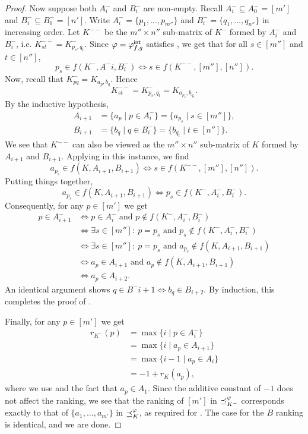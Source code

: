 \begin{proof}
    Now suppose both $A^-_i$ and $B^-_i$ are non-empty. Recall $A^-_i \subseteq
    A^-_0 = [m']$ and $B^-_i \subseteq B^-_0 = [n']$. Write $A^-_i = \{p_1,
    \ldots, p_{m''}\}$ and $B^-_i = \{q_1, \ldots, q_{n''}\}$ in increasing
    order. Let $K^{--}$ be the $m'' \times n''$ sub-matrix of $K^-$ formed by
    $A^-_i$ and $B^-_i$, i.e. $K^{--}_{st} = K^-_{p_s, q_t}$. Since $\varphi =
    {\varphi_{f, g}^\mathsf{int}}$ satisfies \smi{}, we get that for all $s \in [m'']$
    and $t \in [n'']$,
    \[
        p_s \in f(K^-, A^-i, B^-_i) \iff s \in f(K^{--}, [m''], [n'']).
    \]
    Now, recall that $K^-_{pq} = K_{a_p, b_q}$. Hence
    \[
        K^{--}_{st} = K^-_{p_s, q_t} = K_{a_{p_s}, b_{q_t}}.
    \]
    By the inductive hypothesis,
    \begin{align*}
        A_{i + 1} &= \{a_p \mid p \in A^-_i\} = \{a_{p_s} \mid s \in [m'']\}, \\
        B_{i + 1} &= \{b_q \mid q \in B^-_i\} = \{b_{q_t} \mid t \in [n'']\}.
    \end{align*}
    We see that $K^{--}$ can also be viewed as the $m'' \times n''$ sub-matrix
    of $K$ formed by $A_{i + 1}$ and $B_{i + 1}$. Applying \smi{} in
    this instance, we find
    \[
        a_{p_s} \in f(K, A_{i + 1}, B_{i + 1})
            \iff s \in f(K^{--}, [m''], [n'']).
    \]
    Putting things together,
    \[
        a_{p_s} \in f(K, A_{i + 1}, B_{i + 1})
            \iff p_s \in f(K^-, A^-_i, B^-_i).
    \]
    Consequently, for any $p \in [m']$ we get
    \begin{align*}
        p \in A^-_{i + 1}
        &\iff p \in A^-_i \text{ and } p \notin f(K^-, A^-_i, B^-_i) \\
        &\iff \exists s \in [m'']:\ p = p_s \text{ and } p_s \notin f(K^-, A^-_i, B^-_i) \\
        &\iff \exists s \in [m'']:\ p = p_s \text{ and } a_{p_s} \notin f(K, A_{i + 1}, B_{i + 1}) \\
        &\iff a_p \in A_{i + 1} \text{ and } a_p \notin f(K, A_{i + 1}, B_{i + 1}) \\
        &\iff a_p \in A_{i + 2}.
    \end{align*}
    An identical argument shows $q \in B^-{i + 1} \iff b_q \in B_{i + 2}$. By
    induction, this
    completes the proof of .

    Finally, for any $p \in [m']$ we get
    \begin{align*}
        r_{K^-}(p)
        &= \max\{i \mid p \in A^-_i\} \\
        &= \max\{i \mid a_p \in A_{i + 1}\} \\
        &= \max\{i - 1\mid a_p \in A_i\} \\
        &= -1 + r_K(a_p),
    \end{align*}
    where we use  and the fact that $a_p
    \in A_1$. Since the additive constant of $-1$ does not affect the ranking,
    we see that the ranking of $[m']$ in $\preceq_{K^-}^\varphi$ corresponds exactly
    to that of $\{a_1, \ldots, a_{m'}\}$ in $\preceq_K^\varphi$, as required for
    \rankremoval{}. The case for the $B$ ranking is identical, and we
    are done.


\end{proof}
